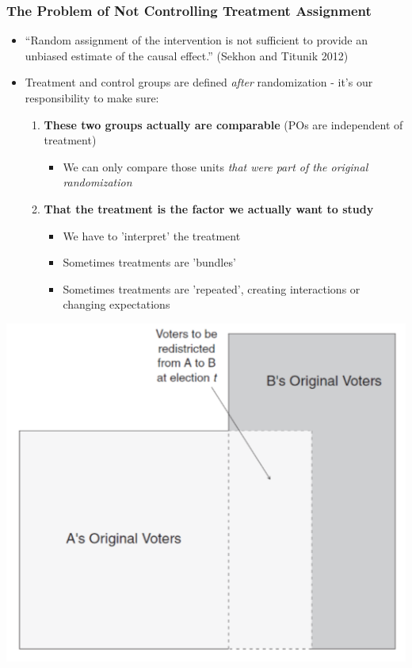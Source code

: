 \documentclass[xcolor=x11names,compress]{beamer}\usepackage[]{graphicx}\usepackage[]{color}
\renewcommand{\(}{\begin{columns}}
\renewcommand{\)}{\end{columns}}
\newcommand{\<}[1]{\begin{column}{#1}}
\renewcommand{\>}{\end{column}}
\begin{document}
\begin{frame}
\frametitle{The Problem of Not Controlling Treatment Assignment}
\begin{itemize}
\item ``Random assignment of the intervention is not sufficient to provide an unbiased estimate of the causal effect.'' (Sekhon and Titunik 2012)
\pause
\item Treatment and control groups are defined \textit{after} randomization - it's our responsibility to make sure:
\pause
\begin{enumerate}
\item \textbf{These two groups actually are comparable} (POs are independent of treatment)
\pause
\begin{itemize}
\item We can only compare those units \textit{that were part of the original randomization}
\end{itemize}
\pause
\item \textbf{That the treatment is the factor we actually want to study}
\pause
\begin{itemize}
\item We have to 'interpret' the treatment
\pause
\item Sometimes treatments are 'bundles'
\pause
\item Sometimes treatments are 'repeated', creating interactions or changing expectations
\end{itemize}
\end{enumerate}
\end{itemize}
\end{frame}

\begin{frame}
\includegraphics[scale=0.38]{Sekhon_redistricting_a.png}
\end{frame}
\end{document}
